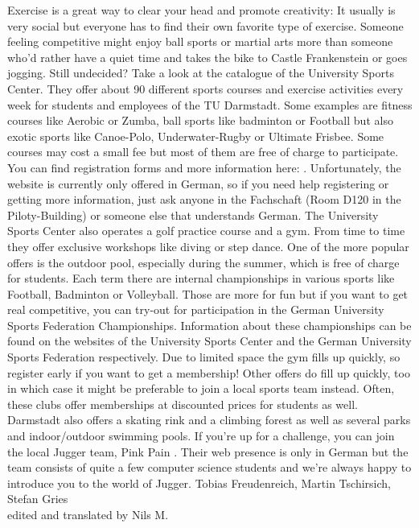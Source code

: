{Exercise is a great way to clear your head and promote creativity: It usually is very social but everyone has to find their own favorite type of exercise.
}{
Someone feeling competitive might enjoy ball sports or martial arts more than someone who'd rather have a quiet time and takes the bike to Castle Frankenstein or goes jogging.
Still undecided? Take a look at the catalogue of the University Sports Center. They offer about 90 different sports courses and exercise activities every week for students and employees of the TU Darmstadt. Some examples are fitness courses like Aerobic or Zumba, ball sports like badminton or Football but also exotic sports like Canoe-Polo, Underwater-Rugby or Ultimate Frisbee.
Some courses may cost a small fee but most of them are free of charge to participate. You can find registration forms and more information here: \footnotemark[1] . Unfortunately, the website is currently only offered in German, so if you need help registering or getting more information, just ask anyone in the Fachschaft (Room D120 in the Piloty-Building) or someone else that understands German. The University Sports Center also operates a golf practice course and a gym. From time to time they offer exclusive workshops like diving or step dance.
One of the more popular offers is the outdoor pool, especially during the summer, which is free of charge for students.
Each term there are internal championships in various sports like Football, Badminton or Volleyball. Those are more for fun but if you want to get real competitive, you can try-out for participation in the German University Sports Federation Championships. Information about these championships can be found on the websites of the University Sports Center \footnotemark[1] and the German University Sports Federation \footnotemark[2] respectively.
Due to limited space the gym fills up quickly, so register early if you want to get a membership! Other offers do fill up quickly, too in which case it might be preferable to join a local sports team instead. Often, these clubs offer memberships at discounted prices for students as well.
Darmstadt also offers a skating rink and a climbing forest as well as several parks and indoor/outdoor swimming pools.
If you're up for a challenge, you can join the local Jugger team, Pink Pain \footnotemark[3] . Their web presence is only in German but the team consists of quite a few computer science students and we're always happy to introduce you to the world of Jugger. 
}
{Tobias Freudenreich, Martin Tschirsich, Stefan Gries \\ edited and translated by Nils M.}

\newpage
